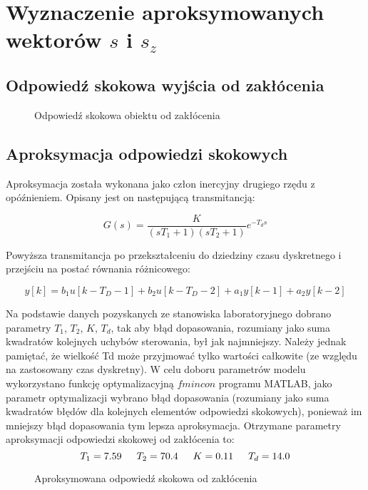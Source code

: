 \section{Wyznaczenie aproksymowanych wektorów $s$ i $s_z$ }
\label{lab:zad3}

\subsection{Odpowiedź skokowa wyjścia od zakłócenia}
\label{lab:zad3:odpSkokZ}

\begin{figure}[H] 
    \centering
    
    \caption{Odpowiedź skokowa obiektu od zakłócenia}
    \label{lab:zad3:odpSkokZ:figure}
\end{figure}

\subsection{Aproksymacja odpowiedzi skokowych}
\label{lab:zad3:approxOdpSkok}

Aproksymacja została wykonana jako człon inercyjny drugiego rzędu z opóźnieniem. 
Opisany jest on następującą transmitancją: 

$$G(s)=\frac{K}{(sT_{1}+1)(sT_{2}+1)}e^{-T_{d}s}$$

Powyższa transmitancja po przekształceniu do dziedziny czasu dyskretnego i przejściu na postać równania różnicowego:

$$y[k]=b_{1}u[k-T_{D}-1]+b_{2}u[k-T_{D}-2]+a_{1}y[k-1]+a_{2}y[k-2]$$
 
Na podstawie danych pozyskanych ze stanowiska laboratoryjnego dobrano parametry 
$T_{1}$, $T_{2}$, $K$, $T_{d}$, tak aby błąd dopasowania, 
rozumiany jako suma kwadratów kolejnych uchybów sterowania, był jak najmniejszy. 
Należy jednak pamiętać, że wielkość Td może przyjmować tylko wartości całkowite 
(ze względu na zastosowany czas dyskretny). 
W celu doboru parametrów modelu wykorzystano funkcję optymalizacyjną $fmincon$ programu MATLAB, 
jako parametr optymalizacji wybrano błąd dopasowania 
(rozumiany jako suma kwadratów błędów dla kolejnych elementów odpowiedzi skokowych), 
ponieważ im mniejszy błąd dopasowania tym lepsza aproksymacja. \newline
Otrzymane parametry aproksymacji odpowiedzi skokowej od zakłócenia to: \newline
\indent $$T_{1}=\num{7.59}
\indent T_{2}=\num{70.4}
\indent K=\num{0.11}
\indent T_{d}=\num{14.0}$$

\begin{figure}[H] 
    \centering
    
    \caption{Aproksymowana odpowiedź skokowa od zakłócenia}
    \label{lab:zad3:approxOdpSkokZ:figure}
\end{figure}

\newpage
